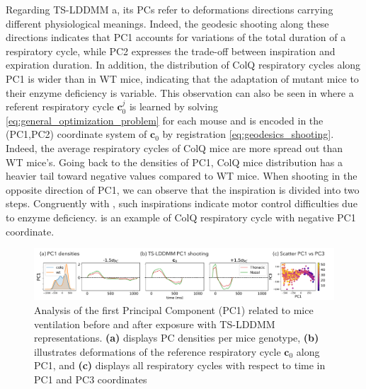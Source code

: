 Regarding TS-LDDMM a, its PCs refer to deformations directions carrying different physiological meanings. Indeed, the geodesic shooting along these directions indicates that PC1 accounts for variations of the total duration of a respiratory cycle, while PC2 expresses the trade-off between inspiration and expiration duration. In addition, the distribution of ColQ respiratory cycles along PC1 is wider than in WT mice, indicating that the adaptation of mutant mice to their enzyme deficiency is variable. This observation can also be seen in  where a referent respiratory cycle $\mathbf{c}_0^j$ is learned by solving \eqref{eq:general_optimization_problem} for each mouse and is encoded in the (PC1,PC2) coordinate system of $\mathbf{c}_0$ by registration \eqref{eq:geodesics_shooting}. Indeed, the average respiratory cycles of ColQ mice are more spread out than WT mice's. Going back to the densities of PC1, ColQ mice distribution has a heavier tail toward negative values compared to WT mice. When shooting in the opposite direction of PC1, we can observe that the inspiration is divided into two steps. Congruently with \cite{germain2023unsupervised}, such inspirations indicate motor control difficulties due to enzyme deficiency.  is an example of ColQ respiratory cycle with negative PC1 coordinate.

\begin{figure}[t]
  \centering
  \includegraphics[width=\linewidth]{pictures/exp after/exp after.pdf}
  \caption{Analysis of the first Principal Component (PC1) related to mice ventilation before and after exposure with TS-LDDMM representations. \textbf{(a)} displays PC densities per mice genotype, \textbf{(b)} illustrates deformations of the reference respiratory cycle $\mathbf{c}_0$ along PC1, and \textbf{(c)} displays all respiratory cycles with respect to time in PC1 and PC3 coordinates}
  \label{fig:exp_2_PCA}
  \vspace{-1.5em}
\end{figure}

